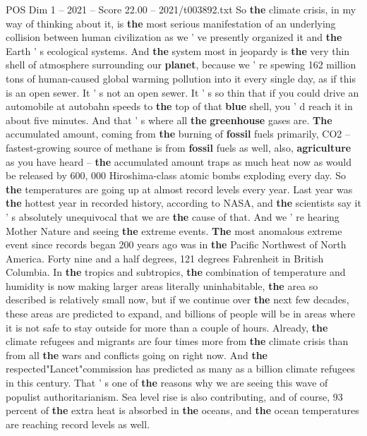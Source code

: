 \begin{textsample}{POS Dim 1 – 2021 – Score 22.00 – 2021/t003892.txt}  \label{ex:f1_pos_062}
So \textbf{the} climate crisis, in my way of thinking about it, is \textbf{the} most serious manifestation of an underlying collision between human civilization as we ' ve presently organized it and \textbf{the} Earth ' s ecological systems.
And \textbf{the} system most in jeopardy is \textbf{the} very thin shell of atmosphere surrounding our \textbf{planet}, because we ' re spewing 162 million tons of human-caused global warming pollution into it every single day, as if this is an open sewer.
It ' s not an open sewer.
It ' s so thin that if you could drive an automobile at autobahn speeds to \textbf{the} top of that \textbf{blue} shell, you ' d reach it in about five minutes.
And that ' s where all \textbf{the} \textbf{greenhouse} gases are. \textbf{The} accumulated amount, coming from \textbf{the} burning of \textbf{fossil} fuels primarily, CO2 -- fastest-growing source of methane is from \textbf{fossil} fuels as well, also, \textbf{agriculture} as you have heard -- \textbf{the} accumulated amount traps as much heat now as would be released by 600, 000 Hiroshima-class atomic bombs exploding every day.
So \textbf{the} temperatures are going up at almost record levels every year.
Last year was \textbf{the} hottest year in recorded history, according to NASA, and \textbf{the} scientists say it ' s absolutely unequivocal that we are \textbf{the} cause of that.
And we ' re hearing Mother Nature and seeing \textbf{the} extreme events. \textbf{The} most anomalous extreme event since records began 200 years ago was in \textbf{the} Pacific Northwest of North America.
Forty nine and a half degrees, 121 degrees Fahrenheit in British Columbia.
In \textbf{the} tropics and subtropics, \textbf{the} combination of temperature and humidity is now making larger areas literally uninhabitable, \textbf{the} area so described is relatively small now, but if we continue over \textbf{the} next few decades, these areas are predicted to expand, and billions of people will be in areas where it is not safe to stay outside for more than a couple of hours.
Already, \textbf{the} climate refugees and migrants are four times more from \textbf{the} climate crisis than from all \textbf{the} wars and conflicts going on right now.
And \textbf{the} respected"Lancet"commission has predicted as many as a billion climate refugees in this century.
That ' s one of \textbf{the} reasons why we are seeing this wave of populist authoritarianism.
Sea level rise is also contributing, and of course, 93 percent of \textbf{the} extra heat is absorbed in \textbf{the} oceans, and \textbf{the} ocean temperatures are reaching record levels as well.

\end{textsample}
